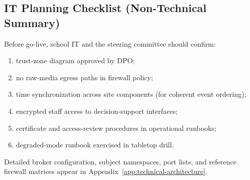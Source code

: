 \subsection{IT Planning Checklist (Non-Technical Summary)}

Before go-live, school IT and the steering committee should confirm:

\begin{enumerate}[noitemsep]
  \item trust-zone diagram approved by DPO;
  \item no raw-media egress paths in firewall policy;
  \item time synchronization across site components (for coherent event ordering);
  \item encrypted staff access to decision-support interfaces;
  \item certificate and access-review procedures in operational runbooks;
  \item degraded-mode runbook exercised in tabletop drill.
\end{enumerate}

Detailed broker configuration, subject namespaces, port lists, and reference firewall
matrices appear in Appendix~\ref{app:technical-architecture}.
